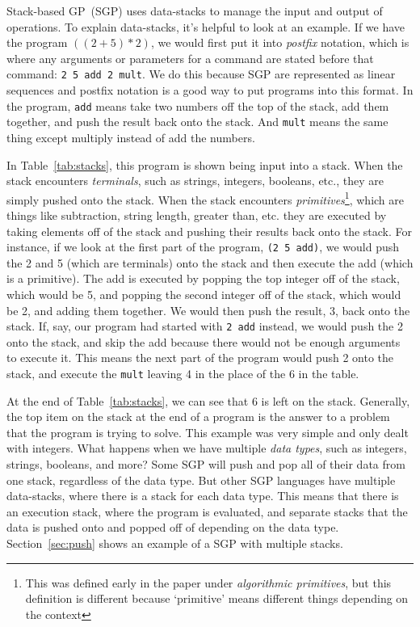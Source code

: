 \documentclass{sig-alternate}
\begin{document}
Stack-based GP~(SGP) uses data-stacks to manage the input and output of operations. To explain data-stacks, it's helpful to look at an example. If we have the program $((2+5)*2)$, we would first put it into \textit{postfix} notation, which is where any arguments or parameters for a command are stated before that command: \texttt{2~5~add~2~mult}. We do this because SGP are represented as linear sequences and postfix notation is a good way to put programs into this format. In the program, \texttt{add} means take two numbers off the top of the stack, add them together, and push the result back onto the stack. And \texttt{mult} means the same thing except multiply instead of add the numbers.

In Table~\ref{tab:stacks}, this program is shown being input into a stack. When the stack encounters \textit{terminals}, such as strings, integers, booleans, etc., they are simply pushed onto the stack. When the stack encounters \textit{primitives}\footnote{This was defined early in the paper under \textit{algorithmic primitives}, but this definition is different because `primitive' means different things depending on the context}, which are things like subtraction, string length, greater than, etc. they are executed by taking elements off of the stack and pushing their results back onto the stack. For instance, if we look at the first part of the program, \texttt{(2~5~add)}, we would push the 2 and 5 (which are terminals) onto the stack and then execute the add (which is a primitive). The add is executed by popping the top integer off of the stack, which would be 5, and popping the second integer off of the stack, which would be 2, and adding them together. We would then push the result, 3, back onto the stack. If, say, our program had started with \texttt{2 add} instead, we would push the 2 onto the stack, and skip the add because there would not be enough arguments to execute it. This means the next part of the program would push 2 onto the stack, and execute the \texttt{mult} leaving 4 in the place of the 6 in the table.

At the end of Table~\ref{tab:stacks}, we can see that 6 is left on the stack. Generally, the top item on the stack at the end of a program is the answer to a problem that the program is trying to solve. This example was very simple and only dealt with integers. What happens when we have multiple \textit{data types}, such as integers, strings, booleans, and more? Some SGP will push and pop all of their data from one stack, regardless of the data type. But other SGP languages have multiple data-stacks, where there is a stack for each data type. This means that there is an execution stack, where the program is evaluated, and separate stacks that the data is pushed onto and popped off of depending on the data type. Section~\ref{sec:push} shows an example of a SGP with multiple stacks.
\end{document}
